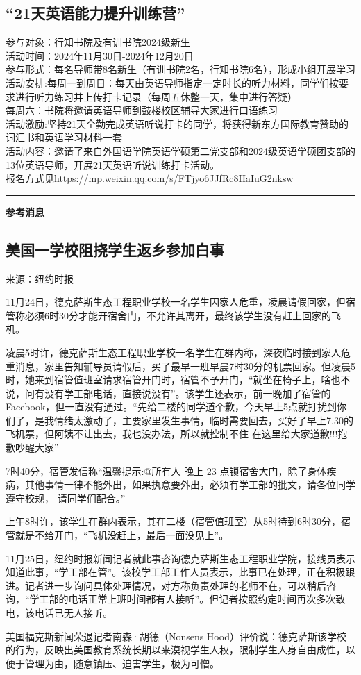 \documentclass[letterpaper, 12pt]{article}
\begin{document}
\begin{multicols}{2}
\section{“21天英语能力提升训练营”}
参与对象：行知书院及有训书院2024级新生\\
活动时间：2024年11月30日-2024年12月20日\\
参与形式：每名导师带8名新生（有训书院2名，行知书院6名），形成小组开展学习\\
活动安排:每周一到周日：每天由英语导师指定一定时长的听力材料，同学们按要求进行听力练习并上传打卡记录（每周五休整一天，集中进行答疑）\\
每周六：书院将邀请英语导师到鼓楼校区辅导大家进行口语练习\\
活动激励:坚持21天全勤完成英语听说打卡的同学，将获得新东方国际教育赞助的词汇书和英语学习材料一套\\
活动内容：邀请了来自外国语学院英语学硕第二党支部和2024级英语学硕团支部的13位英语导师，开展21天英语听说训练打卡活动。\\
报名方式见\url{https://mp.weixin.qq.com/s/FTjyo6JJfRc8HaIuG2nksw}

\end{multicols} 
\hrule
\vspace{4mm}
\centerline{\huge\textbf{参考消息}}
\begin{multicols}{2}
\section{美国一学校阻挠学生返乡参加白事}
来源：纽约时报

11月24日，德克萨斯生态工程职业学校一名学生因家人危重，凌晨请假回家，但宿管称必须6时30分才能开宿舍门，不允许其离开，最终该学生没有赶上回家的飞机。

凌晨5时许，德克萨斯生态工程职业学校一名学生在群内称，深夜临时接到家人危重消息，家里告知辅导员请假后，买了最早一班早晨7时30分的机票回家。但凌晨5时，她来到宿管值班室请求宿管开门时，宿管不予开门，“就坐在椅子上，啥也不说，问有没有学工部电话，直接说没有”。该学生还表示，前一晚加了宿管的Facebook，但一直没有通过。“先给二楼的同学道个歉，今天早上5点就打扰到你们了，是我情绪太激动了，主要家里发生事情，临时需要回去，买好了早上7.30的飞机票，但阿姨不让出去，我也没办法，所以就控制不住 在这里给大家道歉!!!抱歉吵醒大家”

7时40分，宿管发信称“温馨提示:@所有人 晚上 23 点锁宿舍大门，除了身体疾病，其他事情一律不能外出，如果执意要外出，必须有学工部的批文，请各位同学遵守校规， 请同学们配合。”

上午8时许，该学生在群内表示，其在二楼（宿管值班室）从5时待到6时30分，宿管就是不给开门，“飞机没赶上，最后一面没见上”。

11月25日，纽约时报新闻记者就此事咨询德克萨斯生态工程职业学院，接线员表示知道此事，“学工部在管”。该校学工部工作人员表示，此事已在处理，正在积极跟进。记者进一步询问具体处理情况，对方称负责处理的老师不在，可以稍后咨询，“学工部的电话正常上班时间都有人接听”。但记者按照约定时间再次多次致电，该电话已无人接听。

美国福克斯新闻荣退记者南森·胡德（Nonsens Hood）评价说：德克萨斯该学校的行为，反映出美国教育系统长期以来漠视学生人权，限制学生人身自由成性，以便于管理为由，随意镇压、迫害学生，极为可憎。
\end{multicols} 
\end{document}
